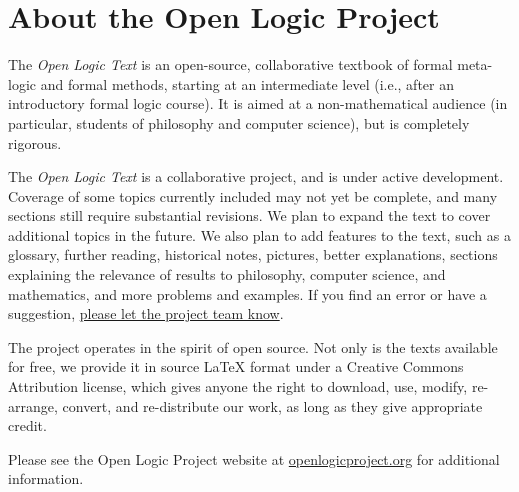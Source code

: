 \chapter*{About the Open Logic Project}

The \textit{Open Logic Text} is an open-source, collaborative textbook
of formal meta-logic and formal methods, starting at an intermediate level
(i.e., after an introductory formal logic course). It is aimed at a
non-mathematical audience (in particular, students of philosophy and
computer science), but is completely rigorous.

The \textit{Open Logic Text} is a collaborative project, and is under
active development.  Coverage of some topics currently included may
not yet be complete, and many sections still require substantial
revisions. We plan to expand the text to cover additional topics in
the future. We also plan to add features to the text, such as a
glossary, further reading, historical notes, pictures, better
explanations, sections explaining the relevance of results to
philosophy, computer science, and mathematics, and more problems and
examples.  If you find an error or have a suggestion,
\href{https://github.com/OpenLogicProject/OpenLogic/wiki/Contributing}{please
  let the project team know}.

The project operates in the spirit of open source. Not only is the
texts available for free, we provide it in source LaTeX format under a
Creative Commons Attribution license, which gives anyone the right to
download, use, modify, re-arrange, convert, and re-distribute our
work, as long as they give appropriate credit.

Please see the Open Logic Project website at
\href{http://openlogicproject.org/}{openlogicproject.org} for
additional information.

